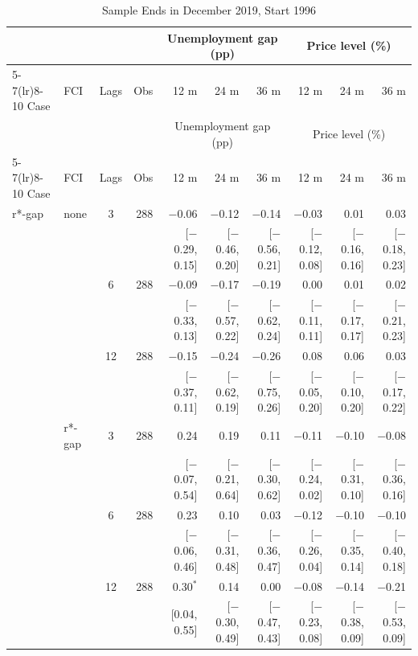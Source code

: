 \begingroup\scriptsize\setlength{\tabcolsep}{0.9pt}
\begin{longtable}{llcrrrrrrr}
\caption{Sample Ends in December 2019, Start 1996}\label{tab:appR1d}\\
\toprule
 & & & & \multicolumn{3}{c}{Unemployment gap (pp)} & \multicolumn{3}{c}{Price level (\%)}\\ \cmidrule(lr){5-7}\cmidrule(lr){8-10}
Case & FCI & Lags & Obs & 12 m & 24 m & 36 m & 12 m & 24 m & 36 m\\
\midrule\endfirsthead
\toprule
 & & & & \multicolumn{3}{c}{Unemployment gap (pp)} & \multicolumn{3}{c}{Price level (\%)}\\ \cmidrule(lr){5-7}\cmidrule(lr){8-10}
Case & FCI & Lags & Obs & 12 m & 24 m & 36 m & 12 m & 24 m & 36 m\\
\midrule\endhead
\bottomrule\endfoot
r*-gap & none & 3 & 288 & $-$0.06 & $-$0.12 & $-$0.14 & $-$0.03 & 0.01 & 0.03\\
 & & & & {\scriptsize [$-$0.29, 0.15]} & {\scriptsize [$-$0.46, 0.20]} & {\scriptsize [$-$0.56, 0.21]} & {\scriptsize [$-$0.12, 0.08]} & {\scriptsize [$-$0.16, 0.16]} & {\scriptsize [$-$0.18, 0.23]}\\
 &  & 6 & 288 & $-$0.09 & $-$0.17 & $-$0.19 & 0.00 & 0.01 & 0.02\\
 & & & & {\scriptsize [$-$0.33, 0.13]} & {\scriptsize [$-$0.57, 0.22]} & {\scriptsize [$-$0.62, 0.24]} & {\scriptsize [$-$0.11, 0.11]} & {\scriptsize [$-$0.17, 0.17]} & {\scriptsize [$-$0.21, 0.23]}\\
 &  & 12 & 288 & $-$0.15 & $-$0.24 & $-$0.26 & 0.08 & 0.06 & 0.03\\
 & & & & {\scriptsize [$-$0.37, 0.11]} & {\scriptsize [$-$0.62, 0.19]} & {\scriptsize [$-$0.75, 0.26]} & {\scriptsize [$-$0.05, 0.20]} & {\scriptsize [$-$0.10, 0.20]} & {\scriptsize [$-$0.17, 0.22]}\\
 & r*-gap & 3 & 288 & 0.24 & 0.19 & 0.11 & $-$0.11 & $-$0.10 & $-$0.08\\
 & & & & {\scriptsize [$-$0.07, 0.54]} & {\scriptsize [$-$0.21, 0.64]} & {\scriptsize [$-$0.30, 0.62]} & {\scriptsize [$-$0.24, 0.02]} & {\scriptsize [$-$0.31, 0.10]} & {\scriptsize [$-$0.36, 0.16]}\\
 &  & 6 & 288 & 0.23 & 0.10 & 0.03 & $-$0.12 & $-$0.10 & $-$0.10\\
 & & & & {\scriptsize [$-$0.06, 0.46]} & {\scriptsize [$-$0.31, 0.48]} & {\scriptsize [$-$0.36, 0.47]} & {\scriptsize [$-$0.26, 0.04]} & {\scriptsize [$-$0.35, 0.14]} & {\scriptsize [$-$0.40, 0.18]}\\
 &  & 12 & 288 & 0.30$^{*}$ & 0.14 & 0.00 & $-$0.08 & $-$0.14 & $-$0.21\\
 & & & & {\scriptsize [0.04, 0.55]} & {\scriptsize [$-$0.30, 0.49]} & {\scriptsize [$-$0.47, 0.43]} & {\scriptsize [$-$0.23, 0.08]} & {\scriptsize [$-$0.38, 0.09]} & {\scriptsize [$-$0.53, 0.09]}\\
\end{longtable}
